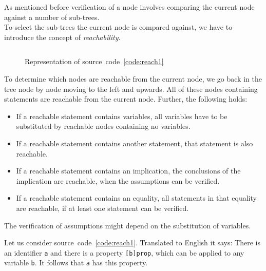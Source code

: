 \documentclass[british]{article}
\newenvironment{code}{\captionsetup{type=listing}}{}
\newcommand\prv{bc}
\newcommand\m[1]{\texttt{#1}}
\begin{document}
As mentioned before verification of a node involves comparing the current node
against a number of sub-trees.\\ To select the sub-trees the current node is
compared against, we have to introduce the concept of \emph{reachability}.


\begin{code}
\label{code:reach1}
\inputminted[linenos]{\prv}{examples/reach1.prove}
\end{code}

\begin{figure}[!h]
\caption{Representation of source~code~\ref{code:reach1}}\label{fig:reach1}
\centering
{}
\end{figure}

To determine which nodes are reachable from the current node, we go back in the
tree node by node moving to the left and upwards. All of these nodes containing
statements are reachable from the current node. Further, the following holds:

\begin{itemize}
	\item
		If a reachable statement contains variables, all variables have to be
		substituted by reachable nodes containing no variables.
	\item
		If a reachable statement contains another statement, that statement is
		also reachable.
	\item
		If a reachable statement contains an implication, the conclusions of the
		implication are reachable, when the assumptions can be verified. 
	\item
		If a reachable statement contains an equality, all statements in that
		equality are reachable, if at least one statement can be verified.
\end{itemize}

The verification of assumptions might depend on the substitution of variables.
\newline

Let us consider source~code~\ref{code:reach1}. Translated to English it says:
There is an identifier \m{a} and there is a property \m{[b]prop}, which can be
applied to any variable \m{b}. It follows that \m{a} has this property.
\newline
\end{document}
